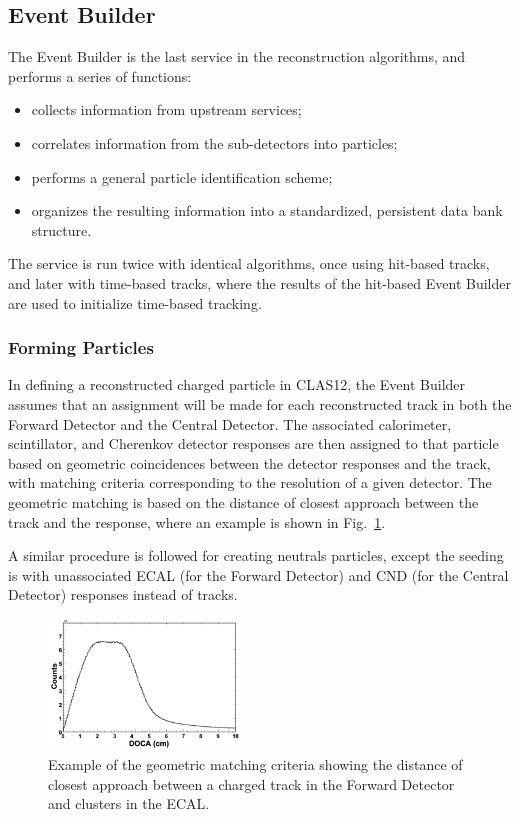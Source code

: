\subsection{Event Builder}
\label{sec:eb}

The Event Builder is the last service in the reconstruction algorithms, and performs a series of functions:

\begin{itemize}
    \item collects information from upstream services;
    \item correlates information from the sub-detectors into particles;
    \item performs a general particle identification scheme;
    \item organizes the resulting information into a standardized, persistent data bank structure.
\end{itemize}

The service is run twice with identical algorithms, once using hit-based tracks, and later with time-based tracks,
where the results of the hit-based Event Builder are used to initialize time-based tracking.

\subsubsection{Forming Particles}

In defining a reconstructed charged particle in CLAS12, the Event Builder assumes that an assignment will be
made for each reconstructed track in both the Forward Detector and the Central Detector. The associated
calorimeter, scintillator, and Cherenkov detector responses are then assigned to that particle based on
geometric coincidences between the detector responses and the track, with matching criteria corresponding
to the resolution of a given detector.  The geometric matching is based on the distance of closest approach
between the track and the response, where an example is shown in Fig.~\ref{fig:ebmatch}.

A similar procedure is followed for creating neutrals particles, except the seeding is with unassociated ECAL
(for the Forward Detector) and CND (for the Central Detector) responses instead of tracks.

\begin{figure}
\centering
\includegraphics[width=0.45\textwidth,height=0.2\textheight]{pics/pcal-doca.png}
\caption{Example of the geometric matching criteria showing the distance of closest approach between a charged
  track in the Forward Detector and clusters in the ECAL.}
  \label{fig:ebmatch}
\end{figure}

